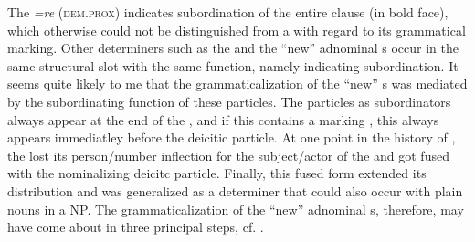 \documentclass[output=paper]{langsci/langscibook}
\begin{document}
\begin{table}
\caption{Grammaticalization of the deictic particles/bound forms \textit{=re}  and \textit{=ga}}
\label{tab:helmbrecht:15}
\end{table}


The   \textit{=re} (\textsc{dem}.\textsc{prox}) indicates subordination of the entire clause (in bold face), which otherwise could not be distinguished from a  with regard to its grammatical marking. Other determiners such as the  and the ``new'' adnominal s occur in the same structural slot with the same function, namely indicating subordination. It seems quite likely to me that the grammaticalization of the ``new'' s was mediated by the subordinating function of these particles. The  particles as subordinators always appear at the end of the , and if this  contains a  marking , this  always appears immediatley before the deicitic particle. At one point in the history of , the  lost its person\slash number inflection for the subject\slash actor of the  and got fused with the nominalizing deicitc particle. Finally, this fused form extended its distribution and was generalized as a  determiner that could also occur with plain nouns in a NP. The grammaticalization of the ``new'' adnominal s, therefore, may have come about in three principal steps, cf. .
\end{document}
